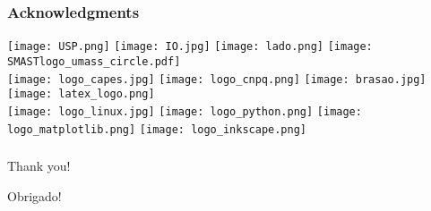 \documentclass{beamer}
\begin{document}
\frame
{
  \frametitle{Acknowledgments}

\texttt{[image: USP.png]}\hspace{1cm}
\texttt{[image: IO.jpg]}\hspace{1cm}
\texttt{[image: lado.png]}\hspace{1cm}
\texttt{[image: SMASTlogo\_umass\_circle.pdf]}\\
\texttt{[image: logo\_capes.jpg]}\hspace{1cm}
\texttt{[image: logo\_cnpq.png]}\hspace{1cm}
\texttt{[image: brasao.jpg]}\hspace{1cm}
\texttt{[image: latex\_logo.png]}\\
\texttt{[image: logo\_linux.jpg]}\hspace{1cm}
\texttt{[image: logo\_python.png]}\hspace{1cm}
\texttt{[image: logo\_matplotlib.png]}\hspace{1cm}
\texttt{[image: logo\_inkscape.png]}

}

\frame
{
  \frametitle{}
\hspace{3.5cm} {\huge Thank you!}\\

\vspace{2cm}

\hspace{3.7cm} {\huge Obrigado!}

}
\end{document}
